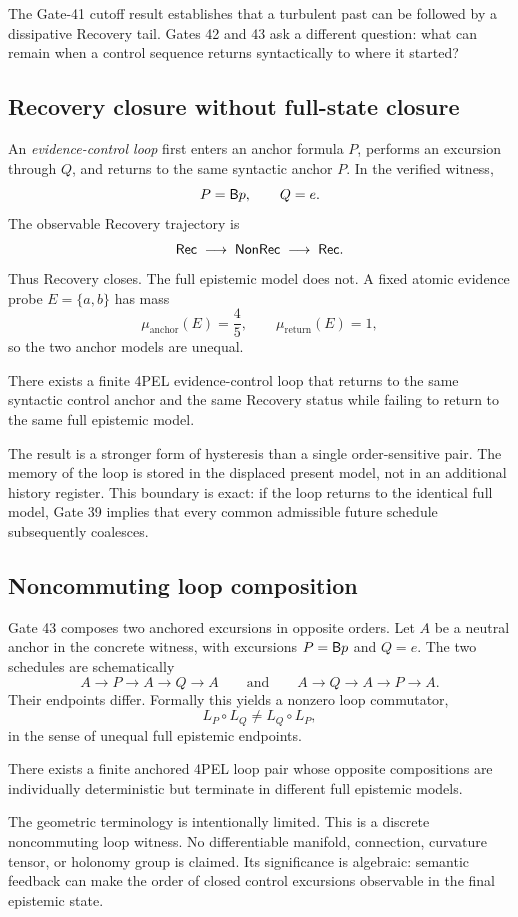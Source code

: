 The Gate-41 cutoff result establishes that a turbulent past can be followed by a dissipative Recovery tail. Gates 42 and 43 ask a different question: what can remain when a control sequence returns syntactically to where it started?

\subsection{Recovery closure without full-state closure}

An \emph{evidence-control loop} first enters an anchor formula $P$, performs an excursion through $Q$, and returns to the same syntactic anchor $P$. In the verified witness,
\[
P=\mathsf{B} p,
\qquad
Q=e.
\]
The observable Recovery trajectory is
\[
\mathsf{Rec}\;\longrightarrow\;\mathsf{NonRec}\;\longrightarrow\;\mathsf{Rec}.
\]
Thus Recovery closes. The full epistemic model does not. A fixed atomic evidence probe $E=\{a,b\}$ has mass
\[
\mu_{\mathrm{anchor}}(E)=\frac45,
\qquad
\mu_{\mathrm{return}}(E)=1,
\]
so the two anchor models are unequal.

\begin{theorem}
There exists a finite 4PEL evidence-control loop that returns to the same syntactic control anchor and the same Recovery status while failing to return to the same full epistemic model.
\end{theorem}

The result is a stronger form of hysteresis than a single order-sensitive pair. The memory of the loop is stored in the displaced present model, not in an additional history register. This boundary is exact: if the loop returns to the identical full model, Gate 39 implies that every common admissible future schedule subsequently coalesces.

\subsection{Noncommuting loop composition}

Gate 43 composes two anchored excursions in opposite orders. Let $A$ be a neutral anchor in the concrete witness, with excursions $P=\mathsf{B} p$ and $Q=e$. The two schedules are schematically
\[
A\to P\to A\to Q\to A
\qquad\text{and}\qquad
A\to Q\to A\to P\to A.
\]
Their endpoints differ. Formally this yields a nonzero loop commutator,
\[
L_P\circ L_Q \neq L_Q\circ L_P,
\]
in the sense of unequal full epistemic endpoints.

\begin{theorem}
There exists a finite anchored 4PEL loop pair whose opposite compositions are individually deterministic but terminate in different full epistemic models.
\end{theorem}

The geometric terminology is intentionally limited. This is a discrete noncommuting loop witness. No differentiable manifold, connection, curvature tensor, or holonomy group is claimed. Its significance is algebraic: semantic feedback can make the order of closed control excursions observable in the final epistemic state.
